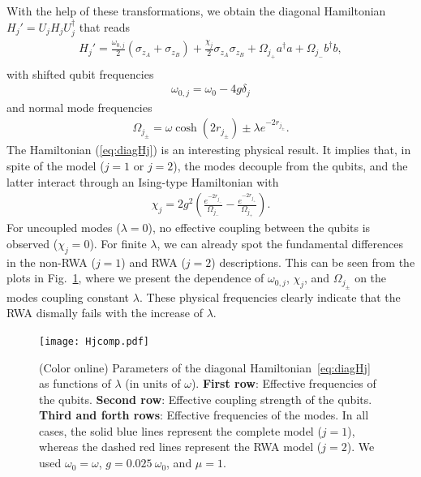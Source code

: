 \documentclass[%
reprint,
amsmath,amssymb,
aps,
pra,
]{revtex4-1}
\begin{document}
With the help of these transformations, we obtain the diagonal Hamiltonian $H_j'=U_jH_jU_j^\dag$ that reads
\begin{eqnarray}
H_j'=\frac{\omega_{0,j}}{2}\left(\sigma_{z_A}+\sigma_{z_B}\right)+\frac{\chi_j}{2}\sigma_{z_A}\sigma_{z_B}
+ \Omega_{j_+} a^{\dagger}a+\Omega_{j_-} b^{\dagger}b,\nonumber\\
\label{eq:diagHj}
\end{eqnarray}
with shifted qubit frequencies 
\begin{eqnarray}
\omega_{0,j}=\omega_0-4g\delta_j
\label{eq:shiftw0}
\end{eqnarray}
and normal mode frequencies
\begin{eqnarray}
\Omega_{j_\pm}=\omega \cosh\left(2r_{j_\pm}\right)\pm\lambda e^{-2r_{j_\pm}}.
\label{eq:shiftw}
\end{eqnarray} 
The Hamiltonian  (\ref{eq:diagHj})  is an interesting physical result. It implies that, in spite of the model ($j=1$ or $j=2$), the modes decouple from the qubits, and the latter  interact through an Ising-type Hamiltonian with
\begin{eqnarray}
\chi_j=2g^2\left(\frac{e^{-2r_{j_-}}}{\Omega_{j_-}}-\frac{e^{-2r_{j_+}}}{\Omega_{j_+}}\right).
\label{eq:chi}
\end{eqnarray}
For uncoupled modes ($\lambda=0$), no effective coupling between the qubits is observed ($\chi_j=0$). For finite  $\lambda$, we can already spot the fundamental differences in the non-RWA ($j=1$) and RWA ($j=2$) descriptions.  This can be seen from the plots in Fig.~\ref{fg:Hjcomp}, where we present the dependence of $\omega_{0,j}$, $\chi_j$, and $\Omega_{j_\pm}$ on the modes coupling constant $\lambda$. These physical frequencies clearly indicate that the RWA dismally fails with the increase of $\lambda$. 
\begin{figure}[h!]
\texttt{[image: Hjcomp.pdf]}
\caption{\label{fg:Hjcomp} (Color online) Parameters of the diagonal Hamiltonian~\eqref{eq:diagHj} as functions of $\lambda$ (in units of $\omega$). \textbf{First row}: Effective frequencies of the qubits. \textbf{Second row}: Effective coupling strength of the qubits. \textbf{Third and forth rows}: Effective frequencies of the modes. In all cases, the solid blue lines represent the complete model ($j=1$), whereas the dashed red lines represent the RWA model ($j=2$). We used $\omega_0=\omega$, $g=0.025\ \omega_0$, and $\mu=1$.}
\end{figure}
\end{document}
